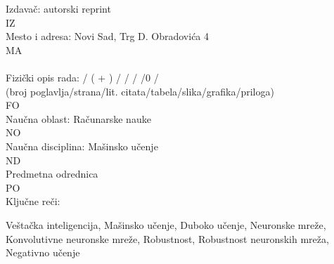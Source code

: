 \begin{tabbing}
  Izdavač:                                                         \> autorski reprint              \\
  IZ                                                               \>                               \\
  Mesto i adresa:                                                  \> Novi Sad, Trg D. Obradovića 4 \\
  MA                                                               \>                               \\
                                                                   \>                               \\
  Fizički opis rada:                                               \> %
  / ( + )%
  /%
  /\totaltables%
  /\totalfigures%
  /0%
  /                                                                                 \\
  \hspace*{2\parindent}
  (broj poglavlja/strana/lit. citata/tabela/slika/grafika/priloga) \>                               \\
  FO                                                               \>                               \\
  Naučna oblast:                                                   \> Računarske nauke              \\
  NO                                                               \>                               \\
  Naučna disciplina:                                               \> Mašinsko učenje
            \\
  ND                                                               \>                               \\
  Predmetna odrednica                                              \>                               \\
  PO                                                               \>                               \\
  Ključne reči:                                                   \> 
    \begin{minipage}[t]{.65\textwidth}
      Veštačka inteligencija, Mašinsko učenje, Duboko učenje,
      Neuronske mreže, Konvolutivne neuronske mreže, Robustnost,
      Robustnost neuronskih mreža, Negativno učenje

\end{minipage}
\end{tabbing}
